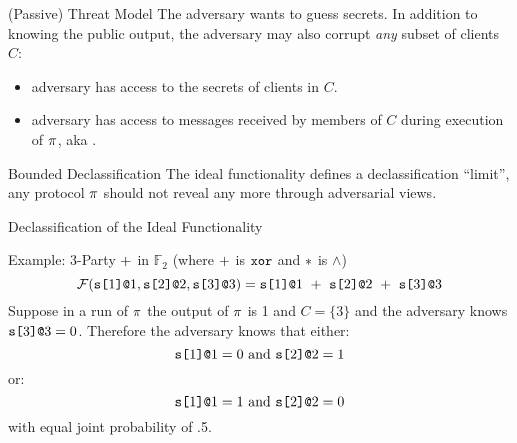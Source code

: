 \documentclass{beamer}
\begin{document}
\begin{frame}{(Passive) Threat Model}
  The adversary wants to guess secrets. In addition to knowing the public
  output, the adversary may also corrupt \emph{any} subset of clients $C$:
  \begin{itemize}
  \item adversary has access to the secrets of clients in $C$.
  \item adversary has access to messages received by members of $C$ during execution of $\pi$,
    aka .
  \end{itemize}

  \begin{alertblock}{Bounded Declassification}
    The ideal functionality defines a declassification ``limit'', any protocol $\pi$
    should not reveal any more through adversarial views.
  \end{alertblock}
\end{frame}

\begin{frame}{Declassification of the Ideal Functionality}

  \begin{exampleblock}{Example: 3-Party $+$ in $\mathbb{F}_2$ (where $+$ is $\texttt{xor}$ and $*$ is $\wedge$)}
  $$
  \mathcal{F}(\texttt{s[}1\texttt{]}\texttt{@}1,\texttt{s[}2\texttt{]}\texttt{@}2,\texttt{s[}3\texttt{]}\texttt{@}3) =
  \texttt{s[}1\texttt{]}\texttt{@}1\ +\ \texttt{s[}2\texttt{]}\texttt{@}2\ +\ \texttt{s[}3\texttt{]}\texttt{@}3
  $$
  Suppose in a run of $\pi$ the output of $\pi$ is 1 and $C = \{ 3 \}$ and
  the adversary knows $\texttt{s[}3\texttt{]}\texttt{@}3 = 0$.
  Therefore the adversary knows that either:
  $$
  \texttt{s[}1\texttt{]}\texttt{@}1 = 0 \text{\ and\ } \texttt{s[}2\texttt{]}\texttt{@}2 = 1
  $$
  or:
  $$
  \texttt{s[}1\texttt{]}\texttt{@}1 = 1 \text{\ and\ } \texttt{s[}2\texttt{]}\texttt{@}2 = 0
  $$
  with equal joint probability of .5. 
  \end{exampleblock}
  
\end{frame}
\end{document}
